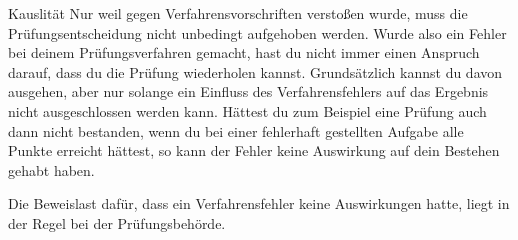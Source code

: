 \begin{artikel}{Kauslität}
Nur weil gegen Verfahrensvorschriften verstoßen wurde, muss die Prüfungsentscheidung nicht unbedingt aufgehoben werden. Wurde also ein Fehler bei deinem Prüfungsverfahren gemacht, hast du nicht immer einen Anspruch darauf, dass du die Prüfung wiederholen kannst. Grundsätzlich kannst du davon ausgehen, aber nur solange ein Einfluss des Verfahrensfehlers auf das Ergebnis nicht ausgeschlossen werden kann. Hättest du zum Beispiel eine Prüfung auch dann nicht bestanden, wenn du bei einer fehlerhaft gestellten Aufgabe alle Punkte erreicht hättest, so kann der Fehler keine Auswirkung auf dein Bestehen gehabt haben.

Die Beweislast dafür, dass ein Verfahrensfehler keine Auswirkungen hatte, liegt in der Regel bei der Prüfungsbehörde.
\end{artikel}

